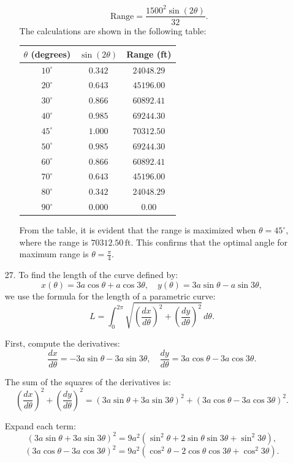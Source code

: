 \documentclass[12pt]{article}
\begin{document}
\begin{enumerate}
\begin{enumerate}
\[
\text{Range} = \frac{1500^2 \sin(2\theta)}{32}.
\]
The calculations are shown in the following table:

\begin{center}
\begin{tabular}{|c|c|c|}
\hline
$\theta$ (degrees) & $\sin(2\theta)$ & Range (ft) \\ \hline
$10^\circ$ & $0.342$ & $24048.29$ \\ 
$20^\circ$ & $0.643$ & $45196.00$ \\ 
$30^\circ$ & $0.866$ & $60892.41$ \\ 
$40^\circ$ & $0.985$ & $69244.30$ \\ 
$45^\circ$ & $1.000$ & $70312.50$ \\ 
$50^\circ$ & $0.985$ & $69244.30$ \\ 
$60^\circ$ & $0.866$ & $60892.41$ \\ 
$70^\circ$ & $0.643$ & $45196.00$ \\ 
$80^\circ$ & $0.342$ & $24048.29$ \\ 
$90^\circ$ & $0.000$ & $0.00$ \\ \hline
\end{tabular}
\end{center}

From the table, it is evident that the range is maximized when $\theta = 45^\circ$, where the range is $70312.50 \, \text{ft}$. This confirms that the optimal angle for maximum range is $\theta = \frac{\pi}{4}$.




\end{enumerate}

\item [27. ]
To find the length of the curve defined by:
\[
x(\theta) = 3a \cos\theta + a \cos 3\theta, \quad y(\theta) = 3a \sin\theta - a \sin 3\theta,
\]
we use the formula for the length of a parametric curve:
\[
L = \int_0^{2\pi} \sqrt{\left(\frac{dx}{d\theta}\right)^2 + \left(\frac{dy}{d\theta}\right)^2} \, d\theta.
\]

First, compute the derivatives:
\[
\frac{dx}{d\theta} = -3a \sin\theta - 3a \sin 3\theta, \quad \frac{dy}{d\theta} = 3a \cos\theta - 3a \cos 3\theta.
\]

The sum of the squares of the derivatives is:
\[
\left(\frac{dx}{d\theta}\right)^2 + \left(\frac{dy}{d\theta}\right)^2 = (3a \sin\theta + 3a \sin 3\theta)^2 + (3a \cos\theta - 3a \cos 3\theta)^2.
\]

Expand each term:
\[
(3a \sin\theta + 3a \sin 3\theta)^2 = 9a^2 (\sin^2\theta + 2 \sin\theta \sin 3\theta + \sin^2 3\theta),
\]
\[
(3a \cos\theta - 3a \cos 3\theta)^2 = 9a^2 (\cos^2\theta - 2 \cos\theta \cos 3\theta + \cos^2 3\theta).
\]


\end{enumerate}
\end{document}
